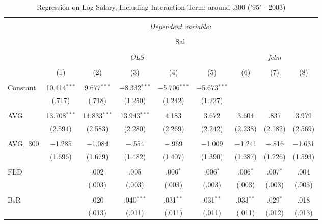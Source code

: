 
\begin{table}[H] \centering
  \caption{Regression on Log-Salary, Including Interaction Term: around .300 ('95' - 2003)} 
  \label{AVG300_C}
\tiny
\begin{tabular}{@{\extracolsep{5pt}}lcccccccc}
\\[-1.8ex]\hline
\hline \\[-1.8ex]
 & \multicolumn{8}{c}{\textit{Dependent variable:}} \\
\cline{2-9}
\\[-1.8ex] & \multicolumn{8}{c}{Sal} \\
\\[-1.8ex] & \multicolumn{5}{c}{\textit{OLS}} & \multicolumn{3}{c}{\textit{felm}} \\
\\[-1.8ex] & (1) & (2) & (3) & (4) & (5) & (6) & (7) & (8)\\
\hline \\[-1.8ex]
 Constant & 10.414$^{***}$ & 9.677$^{***}$ & $-$8.332$^{***}$ & $-$5.706$^{***}$ & $-$5.673$^{***}$ &  &  &  \\
  & (.717) & (.718) & (1.250) & (1.242) & (1.227) &  &  &  \\
  & & & & & & & & \\
 AVG & 13.708$^{***}$ & 14.833$^{***}$ & 13.943$^{***}$ & 4.183 & 3.672 & 3.604 & .837 & 3.979 \\
  & (2.594) & (2.583) & (2.280) & (2.269) & (2.242) & (2.238) & (2.182) & (2.569) \\
  & & & & & & & & \\
 AVG\_300 & $-$1.285 & $-$1.084 & $-$.554 & $-$.969 & $-$1.009 & $-$1.241 & $-$.816 & $-$1.631 \\
  & (1.696) & (1.679) & (1.482) & (1.407) & (1.390) & (1.387) & (1.226) & (1.593) \\
  & & & & & & & & \\
 FLD &  & .002 & .005 & .006$^{*}$ & .006$^{*}$ & .006$^{*}$ & .007$^{*}$ & .004 \\
  &  & (.003) & (.003) & (.003) & (.003) & (.003) & (.003) & (.003) \\
  & & & & & & & & \\
 BsR &  & .020 & .040$^{***}$ & .031$^{**}$ & .031$^{**}$ & .033$^{**}$ & .029$^{*}$ & .018 \\
  &  & (.013) & (.011) & (.011) & (.011) & (.011) & (.012) & (.013) \\

\end{tabular}
\end{table}
